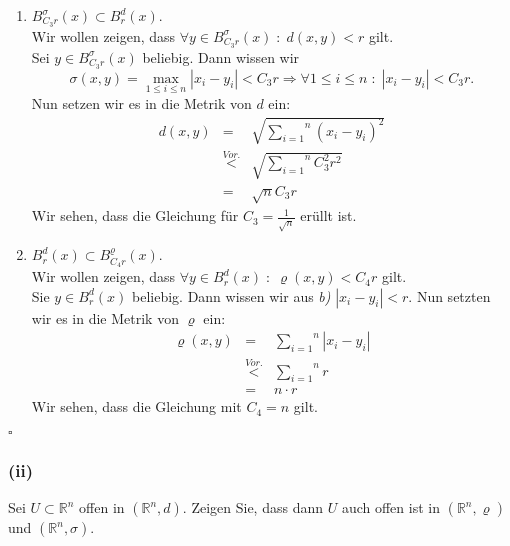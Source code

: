 \begin{enumerate}[\itshape a)]
    \item $B_{C_3r}^\sigma (x) \subset B_r^d (x)$.\\
        Wir wollen zeigen, dass $\forall y \in B_{C_3r}^\sigma (x) \; : \; d(x,y) < r$ gilt.\\
        Sei $y \in B_{C_3r}^\sigma (x)$ beliebig. Dann wissen wir
        $$
            \sigma (x,y) = \underset{1\leq i \leq n}{\max} |x_i - y_i| < C_3r \Rightarrow \forall 1 \leq i \leq n \; : \; |x_i - y_i| < C_3r.
        $$
        Nun setzen wir es in die Metrik von $d$ ein:
        $$\begin{array}{rcl}
            d(x,y)  &=& \sqrt{\overset{n}{\underset{i=1}{\sum}} (x_i - y_i)^2}\\
                    &\stackrel{Vor.}{<}& \sqrt{\overset{n}{\underset{i=1}{\sum}} C_3^2 r^2}\\
                    &=& \sqrt{n} C_3 r
        \end{array}$$
        Wir sehen, dass die Gleichung für $C_3 = \frac{1}{\sqrt{n}}$ erüllt ist.

    \item $B_r^d (x) \subset B_{C_4r}^\varrho (x)$.\\
        Wir wollen zeigen, dass $\forall y \in B_r^d (x) \; : \; \varrho (x,y) < C_4r$ gilt.\\
        Sie $y \in B_r^d (x)$ beliebig. Dann wissen wir aus \emph{b)} $|x_i - y_i| < r$.
        Nun setzten wir es in die Metrik von $\varrho$ ein:\\
        $$\begin{array}{rcl}
            \varrho (x,y)   &=& \overset{n}{\underset{i=1}{\sum}} | x_i - y_i |\\
                            &\stackrel{Vor.}{<}& \overset{n}{\underset{i=1}{\sum}} r\\
                            & = & n \cdot r
        \end{array}$$
        Wir sehen, dass die Gleichung mit $C_4 = n$ gilt.
\end{enumerate}
\mbox{} \hfill $\square$

\pagebreak

\subsubsection*{(ii)} 
Sei $U \subset \mathbb{R}^n$ offen in $(\mathbb{R}^n, d)$. Zeigen Sie, dass dann $U$ auch offen ist 
in $(\mathbb{R}^n, \varrho)$ und $(\mathbb{R}^n, \sigma)$.\\

